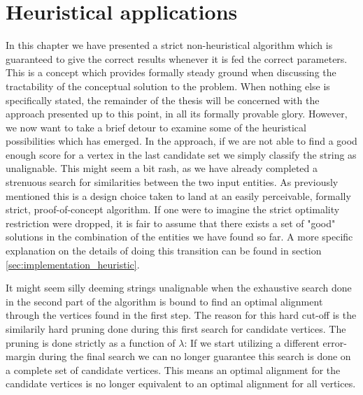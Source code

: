 \documentclass[thesis.tex]{subfiles}
\begin{document}
\section{Heuristical applications}
\label{sec:heuristical_conceptual}
In this chapter we have presented a strict non-heuristical algorithm which is guaranteed to give the correct results whenever it is fed the correct parameters. This is a concept which provides formally steady ground when discussing the tractability of the conceptual solution to the problem. When nothing else is specifically stated, the remainder of the thesis will be concerned with the approach presented up to this point, in all its formally provable glory. However, we now want to take a brief detour to examine some of the heuristical possibilities which has emerged. In the approach, if we are not able to find a good enough score for a vertex in the last candidate set we simply classify the string as unalignable. This might seem a bit rash, as we have already completed a strenuous search for similarities between the two input entities. As previously mentioned this is a design choice taken to land at an easily perceivable, formally strict, proof-of-concept algorithm. If one were to imagine the strict optimality restriction were dropped, it is fair to assume that there exists a set of "good" solutions in the combination of the entities we have found so far. A more specific explanation on the details of doing this transition can be found in section \ref{sec:implementation_heuristic}.\\
\par\noindent
It might seem silly deeming strings unalignable when the exhaustive search done in the second part of the algorithm is bound to find an optimal alignment through the vertices found in the first step. The reason for this hard cut-off is the similarily hard pruning done during this first search for candidate vertices. The pruning is done strictly as a function of $\lambda$: If we start utilizing a different error-margin during the final search we can no longer guarantee this search is done on a complete set of candidate vertices. This means an optimal alignment for the candidate vertices is no longer equivalent to an optimal alignment for all vertices.
\end{document}
